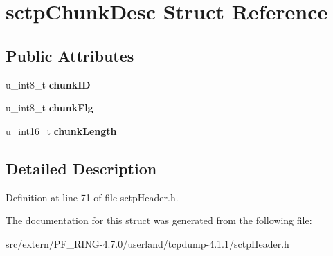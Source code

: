 \hypertarget{structsctp_chunk_desc}{
\section{sctpChunkDesc Struct Reference}
\label{structsctp_chunk_desc}
}
\subsection*{Public Attributes}
\begin{DoxyCompactItemize}
\item 
\hypertarget{structsctp_chunk_desc_a8b2996d02453080b29145a27ef5d7e26}{
u\_\-int8\_\-t {\bfseries chunkID}}
\label{structsctp_chunk_desc_a8b2996d02453080b29145a27ef5d7e26}

\item 
\hypertarget{structsctp_chunk_desc_a7aa0d8c5ded9af08b9de5ddd3d589498}{
u\_\-int8\_\-t {\bfseries chunkFlg}}
\label{structsctp_chunk_desc_a7aa0d8c5ded9af08b9de5ddd3d589498}

\item 
\hypertarget{structsctp_chunk_desc_a2cde2752c9a27431d9091cbb5f99751c}{
u\_\-int16\_\-t {\bfseries chunkLength}}
\label{structsctp_chunk_desc_a2cde2752c9a27431d9091cbb5f99751c}

\end{DoxyCompactItemize}


\subsection{Detailed Description}


Definition at line 71 of file sctpHeader.h.



The documentation for this struct was generated from the following file:\begin{DoxyCompactItemize}
\item 
src/extern/PF\_\-RING-\/4.7.0/userland/tcpdump-\/4.1.1/sctpHeader.h\end{DoxyCompactItemize}
